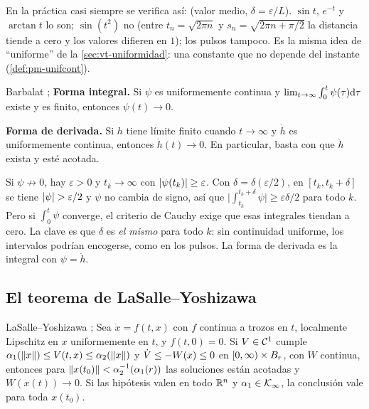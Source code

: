 En la práctica casi siempre se verifica así:  (valor medio, $\delta=\varepsilon/L$). $\sin t$, $e^{-t}$ y $\arctan t$ lo son; $\sin(t^2)$ no (entre $t_n=\sqrt{2\pi n}$ y $s_n=\sqrt{2\pi n+\pi/2}$ la distancia tiende a cero y los valores difieren en $1$); los pulsos tampoco. Es la misma idea de ``uniforme'' de la \cref{sec:vt-uniformidad}: una constante que no depende del instante (\cref{def:pm-unifcont}).

\begin{lema}[label=lem:vt-barbalat]{Barbalat \citep{Bar59}; \citep[Lema~8.2]{Kha02}}
\textbf{Forma integral.} Si $\psi$ es uniformemente continua y $\lim_{t\to\infty}\int_0^t\psi(\tau)\mathrm{d}\tau$ existe y es finito, entonces $\psi(t)\to0$.

\textbf{Forma de derivada.} Si $h$ tiene límite finito cuando $t\to\infty$ y $\dot h$ es uniformemente continua, entonces $\dot h(t)\to0$. En particular, basta con que $\ddot h$ exista y esté acotada.
\end{lema}

\begin{demostracion}
Si $\psi\not\to0$, hay $\varepsilon>0$ y $t_k\to\infty$ con $\left\lvert \psi(t_k)\right\rvert\ge\varepsilon$. Con $\delta=\delta(\varepsilon/2)$, en $[t_k,t_k+\delta]$ se tiene $\left\lvert \psi\right\rvert>\varepsilon/2$ y $\psi$ no cambia de signo, así que $\bigl|\int_{t_k}^{t_k+\delta}\psi\bigr|\ge\varepsilon\delta/2$ para todo $k$. Pero si $\int_0^t\psi$ converge, el criterio de Cauchy exige que esas integrales tiendan a cero. La clave es que $\delta$ es \emph{el mismo} para todo $k$: sin continuidad uniforme, los intervalos podrían encogerse, como en los pulsos. La forma de derivada es la integral con $\psi=\dot h$.
\end{demostracion}


\subsection{El teorema de LaSalle--Yoshizawa}

\begin{teorema}[label=thm:vt-ly]{LaSalle--Yoshizawa \citep{Yos66}; \citep[Teo.~8.4]{Kha02}}
Sea $\dot x=f(t,x)$ con $f$ continua a trozos en $t$, localmente Lipschitz en $x$ uniformemente en $t$, y $f(t,0)=0$. Si $V\in\mathcal{C}^{1}$ cumple $\alpha_1(\left\lVert x\right\rVert)\le V(t,x)\le\alpha_2(\left\lVert x\right\rVert)$ y $\dot V\le-W(x)\le0$ en $[0,\infty)\times B_{r}$, con $W$ continua, entonces para $\left\lVert x(t_0)\right\rVert<\alpha_2^{-1}(\alpha_1(r))$ las soluciones están acotadas y $W(x(t))\to0$. Si las hipótesis valen en todo $\mathbb{R}^n$ y $\alpha_1\in\mathcal{K}_{\infty}$, la conclusión vale para toda $x(t_0)$.
\end{teorema}

